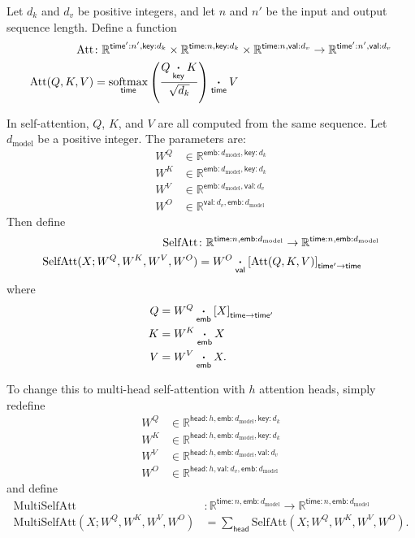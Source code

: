 \documentclass{article}
\newcommand{\name}[1]{\mathsf{#1}}
\newcommand{\ndot}[1]{\mathbin{\mathop{\thinspace\boldsymbol\cdot\thinspace}\limits_{\name{#1}}}}
\newcommand{\nsum}[1]{\mathop{\sum}_{\name{#1}}}
\DeclareMathOperator*{\softmax}{softmax}
\newcommand{\dmodel}{d_{\text{model}}}
\begin{document}
Let $d_k$ and $d_v$ be positive integers, and let $n$ and $n'$ be the input and output sequence length. Define a function
\begin{align*}
  \text{Att} &\colon \mathbb{R}^{\name{time'}:n',\name{key}:d_k} \times \mathbb{R}^{\name{time}:n,\name{key}:d_k} \times \mathbb{R}^{\name{time}:n,\name{val}:d_v} \rightarrow \mathbb{R}^{\name{time'}:n',\name{val}:d_v} \\
  \text{Att}(Q,K,V) &= \softmax_{\name{time}} \left( \frac{Q \ndot{key} K}{\sqrt{d_k}} \right) \ndot{time} V
\end{align*}

In self-attention, $Q$, $K$, and $V$ are all computed from the same sequence.  Let $\dmodel$ be a positive integer. The parameters are:
\begin{align*}
  W^Q &\in \mathbb{R}^{\name{emb}:\dmodel, \name{key}:d_k} \\
  W^K &\in \mathbb{R}^{\name{emb}:\dmodel, \name{key}:d_k} \\
  W^V &\in \mathbb{R}^{\name{emb}:\dmodel, \name{val}:d_v} \\
  W^O &\in \mathbb{R}^{\name{val}:d_v, \name{emb}:\dmodel}
\end{align*}
Then define
\begin{align*}
  \text{SelfAtt} &\colon \mathbb{R}^{\name{time}:n,\name{emb}:\dmodel} \rightarrow \mathbb{R}^{\name{time}:n,\name{emb}:\dmodel} \\
  \text{SelfAtt}(X; W^Q, W^K, W^V, W^O) &= W^O \ndot{val} \left[\text{Att}(Q, K, V)\right]_{\name{time'}\rightarrow\name{time}}
\end{align*}
where
\begin{align*}
  Q &= W^Q \ndot{emb} \left[X\right]_{\name{time}\rightarrow\name{time'}} \\
  K &= W^K \ndot{emb} X \\
  V &= W^V \ndot{emb} X.
\end{align*}

To change this to multi-head self-attention with $h$ attention heads, simply redefine 
\begin{align*}
  W^Q &\in \mathbb{R}^{\name{head}:h, \name{emb}:\dmodel, \name{key}:d_k} \\
  W^K &\in \mathbb{R}^{\name{head}:h, \name{emb}:\dmodel, \name{key}:d_k} \\
  W^V &\in \mathbb{R}^{\name{head}:h, \name{emb}:\dmodel, \name{val}:d_v} \\
  W^O &\in \mathbb{R}^{\name{head}:h, \name{val}:d_v, \name{emb}:\dmodel}
\end{align*}
and define
\begin{align*}
\text{MultiSelfAtt} &\colon \mathbb{R}^{\name{time}:n,\name{emb}:\dmodel} \rightarrow \mathbb{R}^{\name{time}:n,\name{emb}:\dmodel} \\
\text{MultiSelfAtt}(X; W^Q, W^K, W^V, W^O) &= \nsum{head} \text{SelfAtt}(X; W^Q, W^K, W^V, W^O).
\end{align*}
\end{document}
